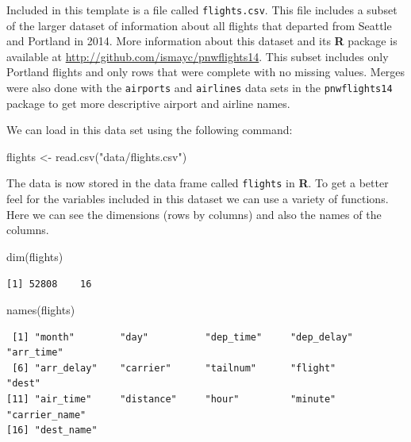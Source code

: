 \documentclass[
  letterpaper,
  12pt,
  twoside]{reedthesis}
\newenvironment{Shaded}{\begin{snugshade}}{\end{snugshade}}
\newcommand{\FunctionTok}[1]{\textcolor[rgb]{0.28,0.35,0.67}{#1}}
\newcommand{\NormalTok}[1]{\textcolor[rgb]{0.00,0.23,0.31}{#1}}
\newcommand{\OtherTok}[1]{\textcolor[rgb]{0.00,0.23,0.31}{#1}}
\newcommand{\StringTok}[1]{\textcolor[rgb]{0.13,0.47,0.30}{#1}}
\begin{document}
Included in this template is a file called \texttt{flights.csv}. This
file includes a subset of the larger dataset of information about all
flights that departed from Seattle and Portland in 2014. More
information about this dataset and its \textbf{R} package is available
at \url{http://github.com/ismayc/pnwflights14}. This subset includes
only Portland flights and only rows that were complete with no missing
values. Merges were also done with the \texttt{airports} and
\texttt{airlines} data sets in the \texttt{pnwflights14} package to get
more descriptive airport and airline names.

We can load in this data set using the following command:

\begin{Shaded}
\begin{Highlighting}[]
\NormalTok{flights }\OtherTok{\textless{}{-}} \FunctionTok{read.csv}\NormalTok{(}\StringTok{"data/flights.csv"}\NormalTok{)}
\end{Highlighting}
\end{Shaded}

The data is now stored in the data frame called \texttt{flights} in
\textbf{R}. To get a better feel for the variables included in this
dataset we can use a variety of functions. Here we can see the
dimensions (rows by columns) and also the names of the columns.

\begin{Shaded}
\begin{Highlighting}[]
\FunctionTok{dim}\NormalTok{(flights)}
\end{Highlighting}
\end{Shaded}

\begin{verbatim}
[1] 52808    16
\end{verbatim}

\begin{Shaded}
\begin{Highlighting}[]
\FunctionTok{names}\NormalTok{(flights)}
\end{Highlighting}
\end{Shaded}

\begin{verbatim}
 [1] "month"        "day"          "dep_time"     "dep_delay"    "arr_time"    
 [6] "arr_delay"    "carrier"      "tailnum"      "flight"       "dest"        
[11] "air_time"     "distance"     "hour"         "minute"       "carrier_name"
[16] "dest_name"   
\end{verbatim}
\end{document}
